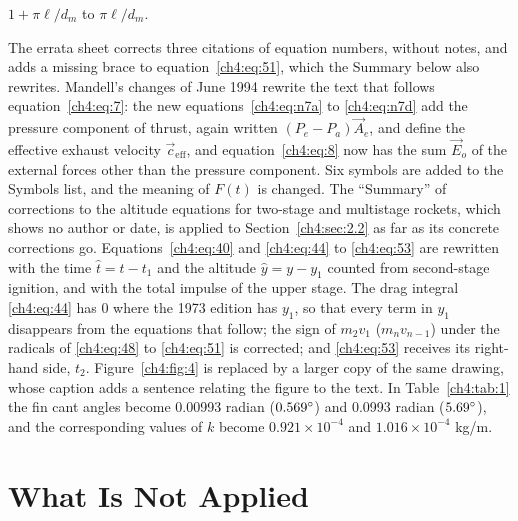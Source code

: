 \begin{description}
    $1 + \pi\ell/d_m$ to $\pi\ell/d_m$.
  \item[Chapter~\ref{ch4}.] The errata sheet corrects three citations of equation numbers, without
    notes, and adds a missing brace to equation~\eqref{ch4:eq:51}, which the Summary below also
    rewrites. Mandell's changes of June 1994 rewrite the text that follows
    equation~\eqref{ch4:eq:7}: the new equations~\eqref{ch4:eq:n7a} to \eqref{ch4:eq:n7d} add the
    pressure component of thrust, again written $(P_e - P_a)\vec{A}_e$, and define the effective
    exhaust velocity $\vec{c}_{\mathrm{eff}}$, and equation~\eqref{ch4:eq:8} now has the sum
    $\vec{E}_o$ of the external forces other than the pressure component. Six symbols are added to
    the Symbols list, and the meaning of $F(t)$ is changed. The ``Summary'' of corrections to the
    altitude equations for two-stage and multistage rockets, which shows no author or date, is
    applied to Section~\ref{ch4:sec:2.2} as far as its concrete corrections go.
    Equations~\eqref{ch4:eq:40} and \eqref{ch4:eq:44} to \eqref{ch4:eq:53} are rewritten with the time
    $\hat{t} = t - t_1$ and the altitude $\hat{y} = y - y_1$ counted from second-stage ignition,
    and with the total impulse of the upper stage. The drag integral \eqref{ch4:eq:44} has 0 where
    the 1973 edition has $y_1$, so that every term in $y_1$ disappears from the equations that
    follow; the sign of $m_2v_1$ ($m_nv_{n-1}$) under the radicals of \eqref{ch4:eq:48} to
    \eqref{ch4:eq:51} is corrected; and \eqref{ch4:eq:53} receives its right-hand side, $t_2$.
    Figure~\ref{ch4:fig:4} is replaced by a larger copy of the same drawing, whose caption adds a
    sentence relating the figure to the text. In Table~\ref{ch4:tab:1} the fin cant angles become
    0.00993 radian ($0.569^{\circ}$) and 0.0993 radian ($5.69^{\circ}$), and the corresponding values of $k$
    become $0.921 \times 10^{-4}$ and $1.016 \times 10^{-4}$ kg/m.
\end{description}

\section*{What Is Not Applied}

